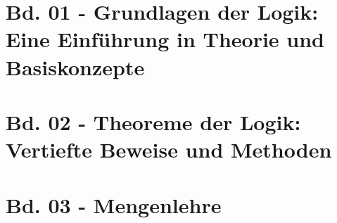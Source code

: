 \documentclass{book}
\newcounter{file}
\theoremstyle{remark}
\begin{document}
\title{}
\author{}
\date{}


\part{Bd. 01 - Grundlagen der Logik: Eine Einführung in Theorie und Basiskonzepte}

\part{Bd. 02 - Theoreme der Logik: Vertiefte Beweise und Methoden}

\part{Bd. 03 - Mengenlehre}

\end{document}
